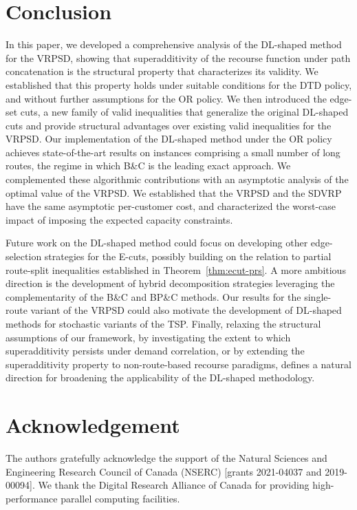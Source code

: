 \documentclass{article}
\newcommand{\rev}[1]{{\color{black}#1}}
\begin{document}
\section{Conclusion} \label{sec:Conc}

In this paper, we developed a comprehensive analysis of the DL-shaped method for the VRPSD, showing that superadditivity of the recourse function under path concatenation is the structural property that characterizes its validity. We established that this property holds under suitable conditions for the DTD policy, and without further assumptions for the OR policy. We then introduced the edge-set cuts, a new family of valid inequalities that generalize the original DL-shaped cuts \rev{and provide structural advantages over existing valid inequalities for the VRPSD}. Our implementation of the DL-shaped method under the OR policy \rev{achieves state-of-the-art results on instances comprising a small number of long routes, the regime in which B\&C is the leading exact approach}. \rev{We complemented these algorithmic contributions with an asymptotic analysis of the optimal value of the VRPSD. We established that the VRPSD and the SDVRP have the same asymptotic per-customer cost, and characterized the worst-case impact of imposing the expected capacity constraints.}

Future work on the DL-shaped method could focus on developing \rev{other edge-selection strategies for the E-cuts, possibly building on the relation to partial route-split inequalities established in Theorem~\ref{thm:ecut-prs}. A more ambitious direction is the development of hybrid decomposition strategies leveraging the complementarity of the B\&C and BP\&C methods}. Our results for the single-route variant of the VRPSD could also motivate the development of DL-shaped methods for stochastic variants of the TSP. \rev{Finally, relaxing the structural assumptions of our framework, by investigating the extent to which superadditivity persists under demand correlation, or by extending the superadditivity property to non-route-based recourse paradigms, defines a natural direction for broadening the applicability of the DL-shaped methodology.}

\section*{Acknowledgement} The authors gratefully acknowledge the support of the Natural Sciences and Engineering Research Council of Canada (NSERC) [grants 2021-04037 and 2019-00094]. We thank the Digital Research Alliance of Canada for providing high-performance parallel computing facilities.



\end{document}
